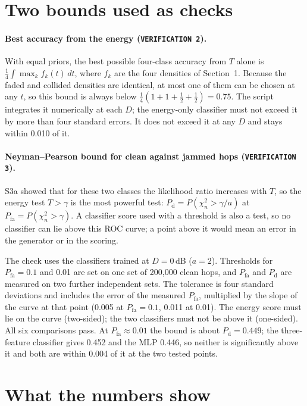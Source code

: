 \documentclass[11pt,a4paper]{article}
\newcommand{\Pfa}{P_{\mathrm{fa}}}
\newcommand{\Pd}{P_{\mathrm{d}}}
\begin{document}
\section{Two bounds used as checks}

\paragraph{Best accuracy from the energy (\texttt{VERIFICATION 2}).}
With equal priors, the best possible four-class accuracy from $T$ alone is
$\tfrac14 \int \max_k f_k(t)\,dt$, where $f_k$ are the four densities of
Section~1. Because the faded and collided densities are identical, at most
one of them can be chosen at any $t$, so this bound is always below
$\tfrac14(1 + 1 + \tfrac12 + \tfrac12) = 0.75$. The script integrates it
numerically at each $D$; the energy-only classifier must not exceed it by
more than four standard errors. It does not exceed it at any $D$ and stays
within 0.010 of it.

\paragraph{Neyman--Pearson bound for clean against jammed hops (\texttt{VERIFICATION 3}).}
S3a showed that for these two classes the likelihood ratio increases with $T$,
so the energy test $T > \gamma$ is the most powerful test:
$\Pd = P(\chi^2_n > \gamma/a)$ at $\Pfa = P(\chi^2_n > \gamma)$. A classifier
score used with a threshold is also a test, so no classifier can lie above this
ROC curve; a point above it would mean an error in the generator or in the
scoring.

The check uses the classifiers trained at $D = 0$\,dB ($a = 2$). Thresholds for
$\Pfa = 0.1$ and 0.01 are set on one set of 200{,}000 clean hops, and $\Pfa$
and $\Pd$ are measured on two further independent sets. The tolerance is four
standard deviations and includes the error of the measured $\Pfa$, multiplied
by the slope of the curve at that point (0.005 at $\Pfa = 0.1$, 0.011 at 0.01).
The energy score must lie on the curve (two-sided); the two classifiers must
not be above it (one-sided). All six comparisons pass. At $\Pfa \approx 0.01$
the bound is about $\Pd = 0.449$; the three-feature classifier gives 0.452 and
the MLP 0.446, so neither is significantly above it and both are within 0.004
of it at the two tested points.

\section{What the numbers show}
\end{document}
